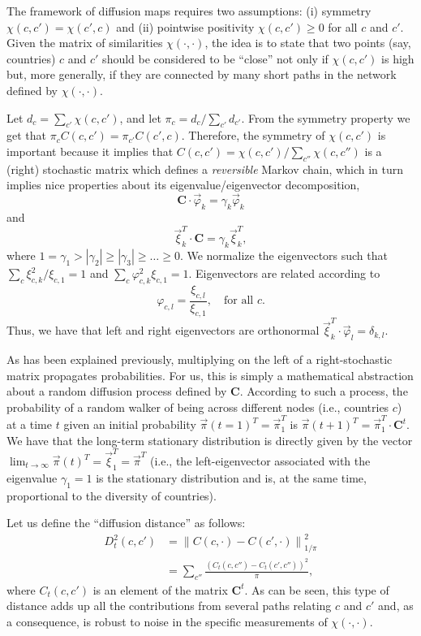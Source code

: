 \documentclass[12pt]{article}
\newcommand{\mtx}[1]{\mathbf{ #1}}
\begin{document}
The framework of diffusion maps requires two assumptions: (i) symmetry $\chi(c, c') = \chi(c', c)$ and (ii) pointwise positivity $\chi(c, c')\geq 0$ for all $c$ and $c'$. Given the matrix of similarities $\chi(\cdot, \cdot)$, the idea is to state that two points (say, countries) $c$ and $c'$ should be considered to be ``close'' not only if $\chi(c, c')$ is high but, more generally, if they are connected by many short paths in the network defined by $\chi(\cdot, \cdot)$. 

Let $d_c = \sum_{c'}\chi(c, c')$, and let $\pi_c = d_c/\sum_{c'}d_{c'}$. From the symmetry property we get that $\pi_c C(c, c')=\pi_{c'} C(c', c)$. Therefore, the symmetry of $\chi(c, c')$ is important because it implies that $C(c, c')=\chi(c, c')/\sum_{c''}\chi(c, c'')$ is a (right) stochastic matrix which defines a \emph{reversible} Markov chain, which in turn implies nice properties about its eigenvalue/eigenvector decomposition, $$\mtx{C}\cdot \vec{\varphi}_k = \gamma_k\vec{\varphi}_k$$ and $$\vec{\xi}_k^T\cdot\mtx{C} = \gamma_k\vec{\xi}_k^T,$$ where $1=\gamma_1>|\gamma_2|\geq |\gamma_3| \geq \ldots \geq 0$. We normalize the eigenvectors such that $\sum_c \xi_{c,k}^2/\xi_{c,1} = 1$ and $\sum_c \varphi_{c,k}^2\xi_{c,1} = 1$. Eigenvectors are related according to $$\varphi_{c,l}=\frac{\xi_{c,l}}{\xi_{c,1}},\quad\text{for all $c$}.$$
Thus, we have that left and right eigenvectors are orthonormal $\vec{\xi}_k^T\cdot\vec{\varphi}_l = \delta_{k,l}$.

As has been explained previously, multiplying on the left of a right-stochastic matrix propagates probabilities. For us, this is simply a mathematical abstraction about a random diffusion process defined by $\mtx{C}$. According to such a process, the probability of a random walker of being across different nodes (i.e., countries $c$) at a time $t$ given an initial probability $\vec{\pi}(t=1)^T=\vec{\pi}_1^T$ is $\vec{\pi}(t+1)^T = \vec{\pi}_1^T\cdot \mtx{C}^t$. We have that the long-term stationary distribution is directly given by the vector $\lim_{t\rightarrow\infty}\vec{\pi}(t)^T =\vec{\xi}_1^T=\vec{\pi}^T$ (i.e., the left-eigenvector associated with the eigenvalue $\gamma_1 = 1$ is the stationary distribution and is, at the same time, proportional to the diversity of countries). 

Let us define the ``diffusion distance'' \citep{coifman2005geometric} as follows:
\begin{align}
	D_t^2(c,c') &= \left\|C(c,\cdot) - C(c',\cdot)\right\|^2_{1/{\pi}} \nonumber\\
	&= \sum_{c''}\frac{\left(C_t(c,c'') - C_t(c',c'')\right)^2}{\pi},
\label{eq_defdiffusiondistance}
\end{align}
where $C_t(c,c')$ is an element of the matrix $\mtx{C}^t$. As can be seen, this type of distance adds up all the contributions from several paths relating $c$ and $c'$ and, as a consequence, is robust to noise in the specific measurements of $\chi(\cdot,\cdot)$.
\end{document}
